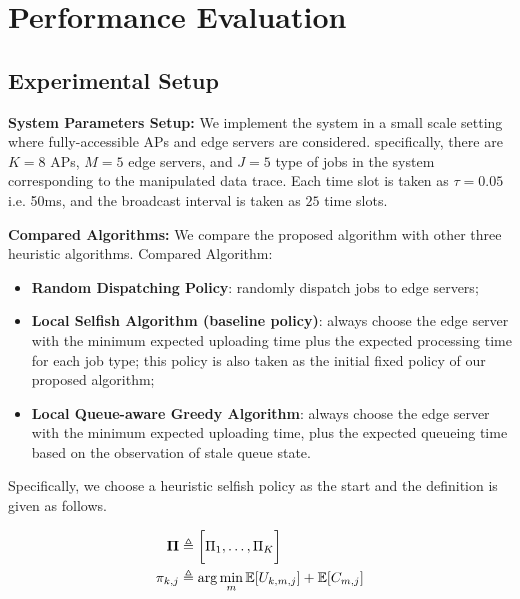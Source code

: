 \section{Performance Evaluation}
\label{sec:evaluation}

\subsection{Experimental Setup}
\textbf{System Parameters Setup:}
We implement the system in a small scale setting where fully-accessible APs and edge servers are considered.
specifically, there are $K=8$ APs, $M=5$ edge servers, and $J=5$ type of jobs in the system corresponding to the manipulated data trace.
Each time slot is taken as $\tau = 0.05$ i.e. 50ms, and the broadcast interval is taken as $25$ time slots.

\textbf{Compared Algorithms:}
We compare the proposed algorithm with other three heuristic algorithms.
Compared Algorithm:
\begin{itemize}
    \item \textbf{Random Dispatching Policy}:
            randomly dispatch jobs to edge servers;
    \item \textbf{Local Selfish Algorithm (baseline policy)}:
            always choose the edge server with the minimum expected uploading time plus the expected processing time for each job type; this policy is also taken as the initial fixed policy of our proposed algorithm;
    \item \textbf{Local Queue-aware Greedy Algorithm}:
            always choose the edge server with the minimum expected uploading time, plus the expected queueing time based on the observation of stale queue state.
\end{itemize}
Specifically, we choose a heuristic selfish policy as the start and the definition is given as follows.
\begin{definition}
    \begin{align}
        \boldsymbol{\Pi} &\triangleq \bigg[ \Pi_{1}, \dots, \Pi_{K} \bigg]
        \\
        \pi_{k,j} &\triangleq \arg\min_{m} \mathbb{E}[U_{k,m,j}] + \mathbb{E}[C_{m,j}]
    \end{align} 
\end{definition}

